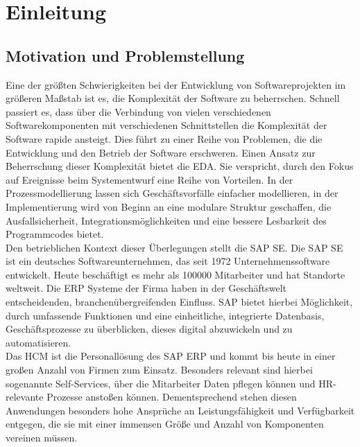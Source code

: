 \section{Einleitung}
\subsection{Motivation und Problemstellung}
Eine der größten Schwierigkeiten bei der Entwicklung von Softwareprojekten im größeren Maßstab ist es, die Komplexität der Software zu beherrschen. Schnell passiert es, dass über die Verbindung von vielen verschiedenen Softwarekomponenten mit verschiedenen Schnittstellen die Komplexität der Software rapide ansteigt. Dies führt zu einer Reihe von Problemen, die die Entwicklung und den Betrieb der Software erschweren. \cite[Vgl.][S. 5]{pressman2005software} Einen Ansatz zur Beherrschung dieser Komplexität bietet die \ac{EDA}. Sie verspricht, durch den Fokus auf Ereignisse beim Systementwurf eine Reihe von Vorteilen. In der Prozessmodellierung lassen sich Geschäftsvorfälle einfacher modellieren, in der Implementierung wird von Beginn an eine modulare Struktur geschaffen, die Ausfallsicherheit, Integrationsmöglichkeiten und eine bessere Lesbarkeit des Programmcodes bietet. \cite[Vgl. ][S. 8f]{EDA2010} \\Den betrieblichen Kontext dieser Überlegungen stellt die SAP SE. Die SAP SE ist ein deutsches Softwareunternehmen, das seit 1972 Unternehmenssoftware entwickelt. Heute beschäftigt es mehr als 100000 Mitarbeiter und hat Standorte weltweit. Die \ac{ERP} Systeme der Firma haben in der Geschäftswelt entscheidenden, branchenübergreifenden Einfluss. SAP bietet hierbei Möglichkeit, durch umfassende Funktionen und eine einheitliche, integrierte Datenbasis, Geschäftsprozesse zu überblicken, dieses digital abzuwickeln und zu automatisieren. \cite[Vgl.][]{sapse_was} \\
Das HCM ist die Personallösung des SAP ERP und kommt bis heute in einer großen Anzahl von Firmen zum Einsatz. Besonders relevant sind hierbei sogenannte Self-Services, über die Mitarbeiter Daten pflegen können und HR-relevante Prozesse anstoßen können. Dementsprechend stehen diesen Anwendungen besonders hohe Ansprüche an Leistungsfähigkeit und Verfügbarkeit entgegen, die sie mit einer immensen Größe und Anzahl von Komponenten vereinen müssen.

